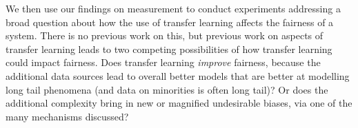
We then use our findings on measurement to conduct experiments addressing a broad question about how the use of transfer learning affects the fairness of a system. There is no previous work on this, but previous work on aspects of transfer learning leads to two competing possibilities of how transfer learning could impact fairness. Does transfer learning \textit{improve} fairness, because the additional data sources lead to overall better models that are better at modelling long tail phenomena \cite{} (and data on minorities is often long tail)? Or does the additional complexity bring in new or magnified undesirable biases, via one of the many mechanisms discussed? 


